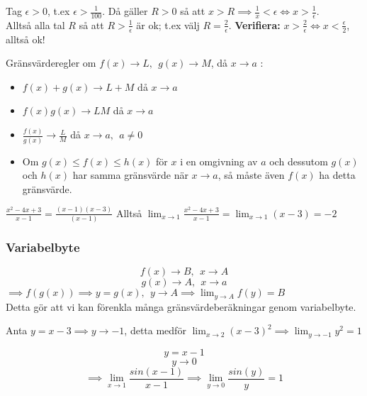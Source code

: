 \documentclass{report}
\begin{document}
\vspace{20pt}
{
	Tag $ \epsilon>0 $, t.ex $ \epsilon> \frac{1}{100} $. Då gäller $ R > 0 $ så att $ x > R \implies \frac{1}{x} < \epsilon \iff x > \frac{1}{ \epsilon} $.\\
	Alltså alla tal $ R $ så att $ R > \frac{1}{ \epsilon}  $ är ok; t.ex välj $ R = \frac{2}{ \epsilon}  $. \textbf{Verifiera:} $ x> \frac{2}{ \epsilon} \iff x < \frac{ \epsilon}{2} $, alltså ok!  
}

Gränsvärderegler om $ f(x)\to L,\:\:g(x)\to M $, då $ x \to a $  :
\begin{itemize}
	\item $ f(x) + g(x) \to L+M $ då $ x\to a $
	\item $ f(x)g(x)\to LM $ då $ x\to a $
	\item $ \frac{f(x)}{g(x)} \to \frac{L}{M}  $ då $ x \to a,\:\: a \ne 0 $
	\item Om $ g(x) \le f(x) \le h(x) $ för $ x $ i en omgivning av $ a $ och dessutom $ g(x) $ och $ h(x) $ har samma gränsvärde när $ x\to a $, så måste även $ f(x) $ ha detta gränsvärde.
\end{itemize}

\pagebreak

{
$\frac{x^2-4x+3}{x-1} = \frac{(x-1)(x-3)}{(x-1)} $ Alltså $ \lim_{x \to 1} \frac{x^2-4x+3}{x-1} = \lim_{x \to 1} (x-3) = -2 $  
}

\subsubsection{Variabelbyte}

\begin{equation*}
f(x) \to B,\:\:x \to A
\end{equation*}
\begin{equation*}
g(x) \to A,\:\:x \to a
\end{equation*}
$ \implies f(g(x)) \implies y = g(x),\:\:y \to A \implies \lim_{y \to A} f(y) = B$\\
Detta gör att vi kan förenkla många gränsvärdeberäkningar genom variabelbyte.

{
Anta $ y = x-3 \implies y \to -1$, detta medför $ \lim_{x \to 2} (x-3)^2 \implies \lim_{y \to -1} y^2 = 1$  
}

\vspace{10pt}
\vspace{10pt}
{
\begin{equation*}
y = x-1
\end{equation*}
\begin{equation*}
y \to 0
\end{equation*}
\begin{equation*}
\implies \lim_{x \to 1} \frac{sin(x-1)}{x-1} \implies \lim_{y \to 0} \frac{sin(y)}{y} = 1
\end{equation*}
}
\end{document}
